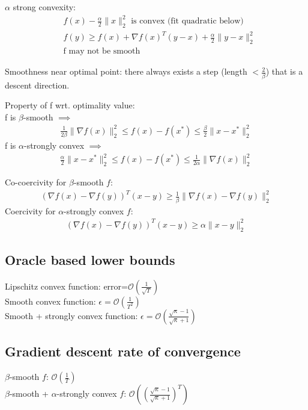 \documentclass[8pt,letter]{article}
\begin{document}
\begin{multicols*}{2}
  $\alpha$ strong convexity:
  \begin{align*}
    & f(x) - \frac{\alpha}{2} \|x\|_2^2 \text{ is convex (fit quadratic below)}\\
    & f(y) \geq f(x) + \nabla f(x)^T (y-x) + \frac{\alpha}{2} \|y-x\|_2^2\\
    & \text{f may not be smooth}
  \end{align*}

  Smoothness near optimal point: there always exists a step (length $<\frac{2}{\beta}$) that is a descent direction.

  Property of f wrt. optimality value:\\
  f is $\beta$-smooth $\implies$
  \begin{align*}
    \frac{1}{2 \beta} \|\nabla f(x) \|_2^2 \leq f(x) -f(x^*) \leq \frac{\beta}{2} \| x-x^* \|_2^2
  \end{align*}
  f is $\alpha$-strongly convex $\implies$
  \begin{align*}
    \frac{\alpha}{2} \| x-x^* \|_2^2 \leq f(x) -f(x^*) \leq \frac{1}{2 \alpha} \|\nabla f(x) \|_2^2
  \end{align*}

  Co-coercivity for $\beta$-smooth $f$:
  \begin{align*}
    \left(\nabla f(x) - \nabla f(y)\right)^T(x-y) \geq \frac{1}{\beta} \|\nabla f(x) - \nabla f(y)\|_2^2
  \end{align*}
  Coercivity for $\alpha$-strongly convex $f$:
  \begin{align*}
    \left(\nabla f(x) - \nabla f(y)\right)^T(x-y) \geq \alpha \|x - y\|_2^2
  \end{align*}
  
  \subsection {Oracle based lower bounds}
  Lipschitz convex function: error=$\mathcal{O}(\frac{1}{\sqrt{T}})$\\
  Smooth convex function: $\epsilon=\mathcal{O}(\frac{1}{T^2})$\\
  Smooth + strongly convex function: $\epsilon=\mathcal{O}(\frac{\sqrt{\kappa}-1}{\sqrt{\kappa}+1})$

  \subsection {Gradient descent rate of convergence}
  $\beta$-smooth $f$: $\mathcal{O}(\frac{1}{T})$\\
  $\beta$-smooth + $\alpha$-strongly convex $f$: $\mathcal{O}((\frac{\sqrt{\kappa}-1}{\sqrt{\kappa}+1})^T)$


\end{multicols*}
\end{document}
